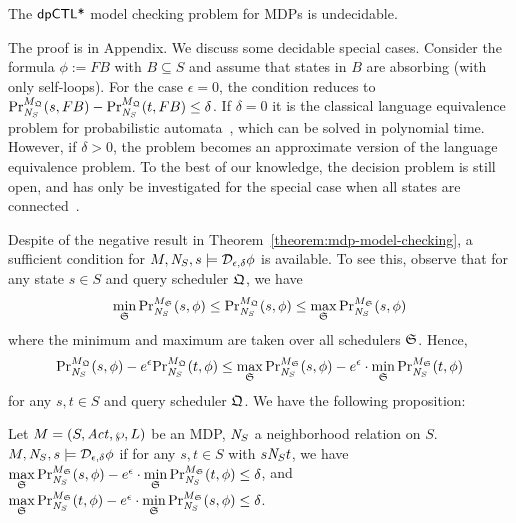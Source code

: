 \begin{theorem}\label{theorem:mdp-model-checking}
The $\dpCTLstar$ model checking problem for MDPs  is undecidable.
\end{theorem}

The proof is in Appendix. We discuss some decidable special cases. Consider the formula $\phi:=F B$ with $B\subseteq S$ and assume that states in $B$ are absorbing (with only self-loops). For the case $\epsilon=0$, the condition reduces to
$\myPr{s}{M_{\scheduler{Q}}}{\neighbor{S}}{F B} -
\myPr{t}{M_{\scheduler{Q}}}{\neighbor{S}}{F B}\le \delta$. If $\delta=0$ it is the classical language equivalence problem for probabilistic automata~\cite{Rabin63}, which can be solved in polynomial time. However, if $\delta>0$, the problem
becomes an approximate version of the language equivalence problem. To the best of our knowledge, the decision problem is still open, and has only be investigated for the special case when all states are connected~\cite{Tzeng92}.


Despite of the negative result in Theorem~\ref{theorem:mdp-model-checking},
a sufficient condition for $M, \neighbor{S}, s \models
\dpriv{\epsilon}{\delta} \phi$ is available.
To see this, observe that for any state $s \in S$ and
query scheduler $\scheduler{Q}$, we have
\[
  \min_{\scheduler{S}} \myPr{s}{M_{\scheduler{S}}}{\neighbor{S}}{\phi} 
  \leq
  \myPr{s}{M_{\scheduler{Q}}}{\neighbor{S}}{\phi} 
  \leq
  \max_{\scheduler{S}} \myPr{s}{M_{\scheduler{S}}}{\neighbor{S}}{\phi} 
\]
where the minimum and maximum are taken over all schedulers
$\scheduler{S}$. Hence, 
\begin{eqnarray*}
  \myPr{s}{M_{\scheduler{Q}}}{\neighbor{S}}{\phi} -
      e^\epsilon \myPr{t}{M_{\scheduler{Q}}}{\neighbor{S}}{\phi}
  \leq
    \max_{\scheduler{S}} \myPr{s}{M_{\scheduler{S}}}{\neighbor{S}}{\phi}
    - e^\epsilon \cdot
    \min_{\scheduler{S}} \myPr{t}{M_{\scheduler{S}}}{\neighbor{S}}{\phi}
\end{eqnarray*}
for any $s, t \in S$ and query scheduler $\scheduler{Q}$. We have the
following proposition:
\begin{proposition}\label{proposition:sufficient-condition-mdp-model-checking}
  Let $M = (S, \Act, \wp, L)$ be an MDP, $\neighbor{S}$ a
  neighborhood relation on $S$.
  $M, \neighbor{S}, s \models \dpriv{\epsilon}{\delta} \phi$ if
  for any $s, t \in S$ with $s \neighbor{S} t$, we have
  $\max\limits_{\scheduler{S}} \myPr{s}{M_{\scheduler{S}}}{\neighbor{S}}{\phi}
    - e^\epsilon \cdot
    \min\limits_{\scheduler{S}} \myPr{t}{M_{\scheduler{S}}}{\neighbor{S}}{\phi}
    \leq \delta$, and
  $\max\limits_{\scheduler{S}} \myPr{t}{M_{\scheduler{S}}}{\neighbor{S}}{\phi}
    - e^\epsilon \cdot
    \min\limits_{\scheduler{S}} \myPr{s}{M_{\scheduler{S}}}{\neighbor{S}}{\phi}
    \leq \delta$.
\end{proposition}

